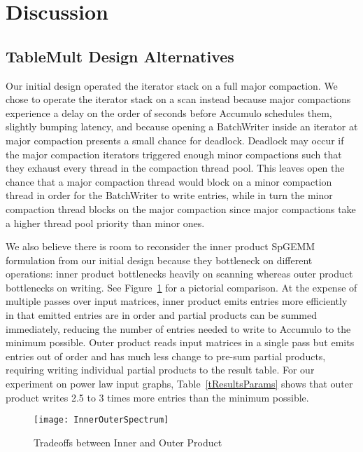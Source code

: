 
\section{Discussion}
\label{sDiscussion}

\subsection{TableMult Design Alternatives}
Our initial design operated the iterator stack on a full major compaction.
We chose to operate the iterator stack on a scan instead because major compactions experience
a delay on the order of seconds before Accumulo schedules them, slightly bumping latency,
and because opening a BatchWriter inside an iterator at major compaction presents a small chance for deadlock.
Deadlock may occur if the major compaction iterators triggered enough minor compactions 
such that they exhaust every thread in the compaction thread pool.
This leaves open the chance that a major compaction thread would block on a minor compaction thread
in order for the BatchWriter to write entries, while in turn the minor compaction thread blocks on 
the major compaction since major compactions take a higher thread pool priority than minor ones.

We also believe there is room to reconsider the inner product SpGEMM formulation from our initial design
because they bottleneck on different operations: 
inner product bottlenecks heavily on scanning whereas outer product bottlenecks on writing.
See Figure~\ref{fInnerOuterSpectrum} for a pictorial comparison.
At the expense of multiple passes over input matrices, inner product emits entries more efficiently
in that emitted entries are in order and partial products can be summed immediately, 
reducing the number of entries needed to write to Accumulo to the minimum possible.
Outer product reads input matrices in a single pass
but emits %
entries out of order and 
has much less change to pre-sum partial products, 
requiring writing individual partial products to the result table.
For our experiment on power law input graphs, Table~\ref{tResultsParams} shows that outer product 
writes 2.5 to 3 times more entries than the minimum possible.

\begin{figure}[tbh]
\centering
\texttt{[image: InnerOuterSpectrum]}
\caption{Tradeoffs between Inner and Outer Product}
\label{fInnerOuterSpectrum}
\end{figure}

